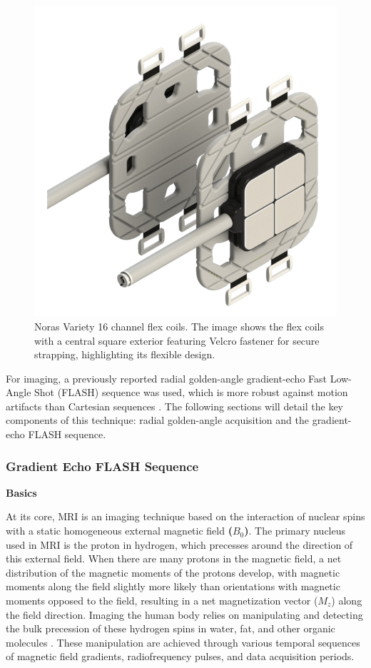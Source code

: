\documentclass{micro-econ-thesis}
\begin{document}
\begin{figure}[H]
	\centering
	\includegraphics[scale=0.2]{coils}
	\caption{Noras Variety 16 channel flex coils. The image shows the flex coils with a central square exterior featuring Velcro fastener for secure strapping, highlighting its flexible design.}
	\label{fig:coils}
\end{figure}
  
For imaging, a previously reported radial golden-angle gradient-echo Fast Low-Angle Shot (FLASH) sequence was used, which is more robust against motion artifacts than Cartesian sequences \parencite{aleksiev_high-resolution_2022}. The following sections will detail the key components of this technique: radial golden-angle acquisition and the gradient-echo FLASH sequence.

\subsubsection{Gradient Echo FLASH Sequence}

\textbf{Basics}

At its core, MRI is an imaging technique based on the interaction of nuclear spins with a static homogeneous external magnetic field \textbf{($B_0$)}. The primary nucleus used in MRI is the proton in hydrogen, which precesses around the direction of this external field.  When there are many protons in the magnetic field, a net distribution of the magnetic moments of the protons develop, with magnetic moments along the field slightly more likely than orientations with magnetic moments opposed to the field, resulting in a net magnetization vector (\textbf{$M_z$}) along the field direction. Imaging the human body relies on manipulating and detecting the bulk precession of these hydrogen spins in water, fat, and other organic molecules \parencite{brown_magnetic_2014}. These manipulation are achieved through various temporal sequences of magnetic field gradients, radiofrequency pulses, and data acquisition periods. 
\end{document}
